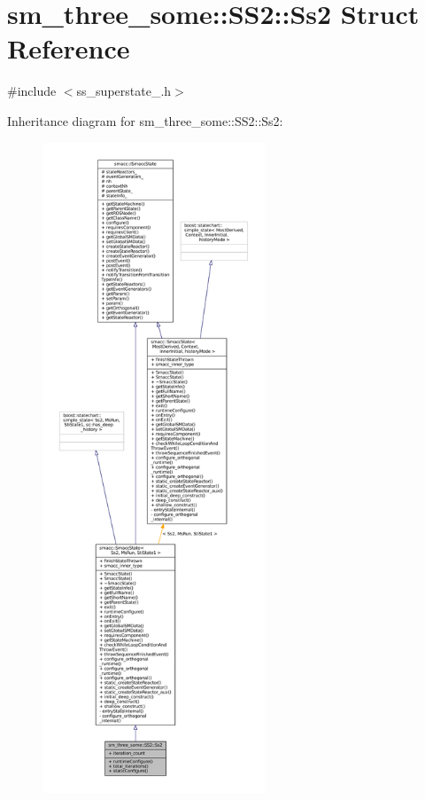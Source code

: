 \hypertarget{structsm__three__some_1_1SS2_1_1Ss2}{}\section{sm\+\_\+three\+\_\+some\+:\+:S\+S2\+:\+:Ss2 Struct Reference}
\label{structsm__three__some_1_1SS2_1_1Ss2}


{\ttfamily \#include $<$ss\+\_\+superstate\+\_.\+h$>$}



Inheritance diagram for sm\+\_\+three\+\_\+some\+:\+:S\+S2\+:\+:Ss2\+:
\nopagebreak
\begin{figure}[H]
\begin{center}
\leavevmode
\includegraphics[height=550pt]{structsm__three__some_1_1SS2_1_1Ss2__inherit__graph}
\end{center}
\end{figure}


